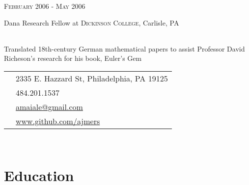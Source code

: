 \documentclass[10pt]{article} %
\begin{document}
{\begin{minipage}[t]{0.5\textwidth}
{\raggedleft\textsc{February 2006 - May 2006}\par}

{\raggedright\large Dana Research Fellow at \textsc{Dickinson College}, Carlisle, PA\\
\\[5pt]}

\normalsize{Translated 18th-century German mathematical papers to assist Professor David Richeson's research for his book, Euler's Gem}\\


\end{minipage} %
\hfill
\begin{minipage}[t]{0.44\textwidth} 
\vspace{20pt} %


\colorbox{shade}{\textcolor{text1}{
\begin{tabular}{c|p{7cm}}
\raisebox{-4pt}{\textifsymbol{18}} & 2335 E. Hazzard St, Philadelphia, PA 19125 \\ %
\raisebox{-3pt}{\Mobilefone} & 484.201.1537 \\ %
\raisebox{-1pt}{\Letter} & \href{mailto:amaiale@gmail.com}{amaiale@gmail.com} \\ %
& \href{http://www.github.com/ajmers}{www.github.com/ajmers}\\
\end{tabular}
}
}\\[10pt]


\section{Education} 

\begin{tabular}{rl} %


\end{tabular}
\end{minipage}}
\end{document}
